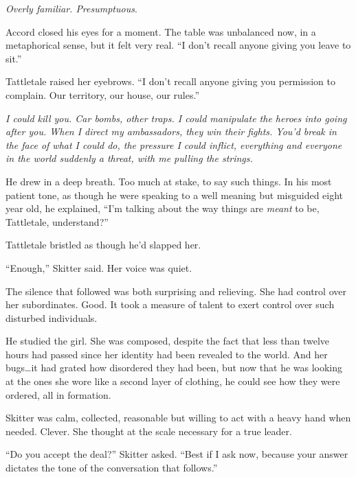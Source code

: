 \emph{Overly familiar.  Presumptuous}.



Accord closed his eyes for a moment.  The table was unbalanced now, in a metaphorical sense, but it felt very real.  ``I don't recall anyone giving you leave to sit.''



Tattletale raised her eyebrows.  ``I don't recall anyone giving you permission to complain.  Our territory, our house, our rules.''



\emph{I could kill you.  Car bombs, other traps.  I could manipulate the heroes into going after you.  When I direct my ambassadors, they win their fights.  You'd break in the face of what I could do, the pressure I could inflict, everything and everyone in the world suddenly a threat, with me pulling the strings.  }



He drew in a deep breath.  Too much at stake, to say such things.  In his most patient tone, as though he were speaking to a well meaning but misguided eight year old, he explained, ``I'm talking about the way things are \emph{meant} to be, Tattletale, understand?''



Tattletale bristled as though he'd slapped her.



``Enough,'' Skitter said.  Her voice was quiet.



The silence that followed was both surprising and relieving.  She had control over her subordinates.  Good.  It took a measure of talent to exert control over such disturbed individuals.



He studied the girl.  She was composed, despite the fact that less than twelve hours had passed since her identity had been revealed to the world.  And her bugs\ldots it had grated how disordered they had been, but now that he was looking at the ones she wore like a second layer of clothing, he could see how they were ordered, all in formation.



Skitter was calm, collected, reasonable but willing to act with a heavy hand when needed.  Clever.  She thought at the scale necessary for a true leader.



``Do you accept the deal?'' Skitter asked.  ``Best if I ask now, because your answer dictates the tone of the conversation that follows.''



